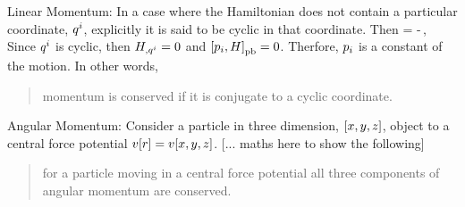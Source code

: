 Linear Momentum: In a case where the Hamiltonian does not contain a particular coordinate, ${q}^{i}$, explicitly it is said to be cyclic in that coordinate. Then
\beq
{} = -\xpd{}\,,
\eeq
Since ${q}^{i}$ is cyclic, then ${H}_{,{{q}^{i}}} = 0$ and $\left[{{p}_{i}, H}\right]_{\text{pb}} = 0$. Therfore, ${p}_{i}$ is a constant of the motion. In other words, 
\begin{quote}
momentum is conserved if it is conjugate to a cyclic coordinate.
\end{quote}


Angular Momentum: Consider a particle in three dimension, $\left[{x,y,z}\right]$, object to a central force potential $v\!\left[{r}\right] = v\!\left[{x,y,z}\right]$. [... maths here to show the following]
\begin{quote}
for a particle moving in a central force potential all three components of angular momentum are conserved.
\end{quote}





